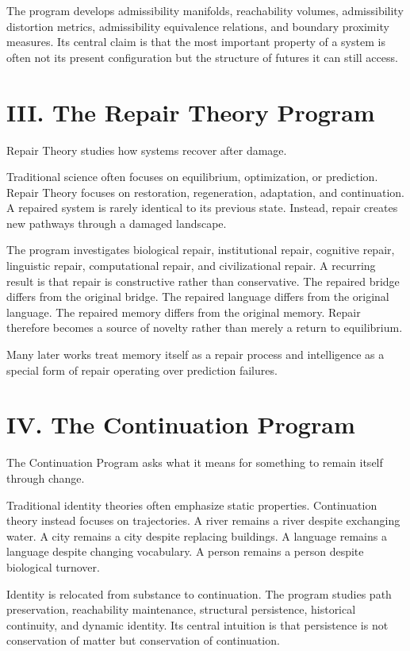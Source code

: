 \documentclass[12pt, openany]{book}
\begin{document}
The program develops admissibility manifolds, reachability volumes,
admissibility distortion metrics, admissibility equivalence relations, and
boundary proximity measures. Its central claim is that the most important
property of a system is often not its present configuration but the
structure of futures it can still access.

\section{III. The Repair Theory Program}

Repair Theory studies how systems recover after damage.

Traditional science often focuses on equilibrium, optimization, or
prediction. Repair Theory focuses on restoration, regeneration, adaptation,
and continuation. A repaired system is rarely identical to its previous
state. Instead, repair creates new pathways through a damaged landscape.

The program investigates biological repair, institutional repair, cognitive
repair, linguistic repair, computational repair, and civilizational repair.
A recurring result is that repair is constructive rather than conservative.
The repaired bridge differs from the original bridge. The repaired language
differs from the original language. The repaired memory differs from the
original memory. Repair therefore becomes a source of novelty rather than
merely a return to equilibrium.

Many later works treat memory itself as a repair process and intelligence as
a special form of repair operating over prediction failures.

\section{IV. The Continuation Program}

The Continuation Program asks what it means for something to remain itself
through change.

Traditional identity theories often emphasize static properties. Continuation
theory instead focuses on trajectories. A river remains a river despite
exchanging water. A city remains a city despite replacing buildings. A
language remains a language despite changing vocabulary. A person remains a
person despite biological turnover.

Identity is relocated from substance to continuation. The program studies
path preservation, reachability maintenance, structural persistence,
historical continuity, and dynamic identity. Its central intuition is that
persistence is not conservation of matter but conservation of continuation.
\end{document}
